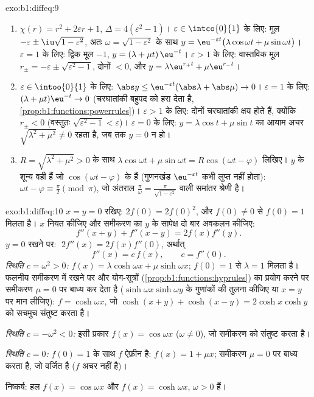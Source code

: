 \begin{solution}{exo:b1:diffeq:9}
\begin{enumerate}
  \item $\chi(r) = r^2 + 2\varepsilon r + 1$, $\Delta = 4(\varepsilon^2 -
  1)$। $\varepsilon \in \intco{0}{1}$ के लिए: मूल $-\varepsilon \pm
  \iu\sqrt{1 - \varepsilon^2}$, अतः $\omega = \sqrt{1 - \varepsilon^2}$ के
  साथ $y = \eu^{-\varepsilon t}\bigl(\lambda\cos\omega t + \mu\sin\omega
  t\bigr)$। $\varepsilon = 1$ के लिए: द्विक मूल $-1$, $y = (\lambda + \mu
  t)\,\eu^{-t}$। $\varepsilon > 1$ के लिए: वास्तविक मूल $r_\pm =
  -\varepsilon \pm \sqrt{\varepsilon^2 - 1}$, दोनों $< 0$, और $y =
  \lambda\eu^{r_+t} + \mu\eu^{r_-t}$।
  \item $\varepsilon \in \intoo{0}{1}$ के लिए: $\abs y \leq
  \eu^{-\varepsilon t}(\abs\lambda + \abs\mu) \to 0$। $\varepsilon = 1$ के
  लिए: $(\lambda + \mu t)\eu^{-t} \to 0$ (चरघातांकी बहुपद को हरा देता है,
  \cref{prop:b1:functions:powerrules})। $\varepsilon > 1$ के लिए: दोनों
  चरघातांकी क्षय होते हैं, क्योंकि $r_\pm < 0$ (वस्तुतः $\sqrt{\varepsilon^2
  - 1} < \varepsilon$)। $\varepsilon = 0$ के लिए: $y = \lambda\cos t +
  \mu\sin t$ का आयाम अचर $\sqrt{\lambda^2 + \mu^2} \neq 0$ रहता है, जब तक $y
  = 0$ न हो।
  \item $R = \sqrt{\lambda^2 + \mu^2} > 0$ के साथ $\lambda\cos\omega t +
  \mu\sin\omega t = R\cos(\omega t - \varphi)$ लिखिए। $y$ के शून्य वही हैं
  जो $\cos(\omega t - \varphi)$ के हैं (गुणनखंड $\eu^{-\varepsilon t}$ कभी
  लुप्त नहीं होता): $\omega t - \varphi \equiv \frac\pi2 \pmod \pi$, जो
  अंतराल $\frac{\pi}{\omega} = \frac{\pi}{\sqrt{1 - \varepsilon^2}}$ वाली
  समांतर श्रेणी है।
\end{enumerate}
\end{solution}

\begin{solution}{exo:b1:diffeq:10}
$x = y = 0$ रखिए: $2f(0) = 2f(0)^2$, और $f(0) \neq 0$ से $f(0) = 1$ मिलता
है। $x$ नियत कीजिए और समीकरण का $y$ के सापेक्ष दो बार अवकलन कीजिए:
\[
f''(x+y) + f''(x-y) = 2 f(x) f''(y) .
\]
$y = 0$ रखने पर: $\;2f''(x) = 2 f(x) f''(0)$, अर्थात्
\[
f''(x) = c\,f(x), \qquad c = f''(0).
\]
\emph{स्थिति $c = \omega^2 > 0$:} $f(x) = \lambda\cosh\omega x +
\mu\sinh\omega x$; $f(0) = 1$ से $\lambda = 1$ मिलता है। फलनीय समीकरण में
रखने पर और योग-सूत्रों (\cref{prop:b1:functions:hyprules}) का प्रयोग करने पर
समीकरण $\mu = 0$ पर बाध्य कर देता है ($\sinh\omega x \sinh\omega y$ के
गुणांकों की तुलना कीजिए या $x = y$ पर मान लीजिए): $f = \cosh\omega x$, जो
$\cosh(x+y) + \cosh(x-y) = 2\cosh x\cosh y$ को सचमुच संतुष्ट करता है।

\emph{स्थिति $c = -\omega^2 < 0$:} इसी प्रकार $f(x) = \cos\omega x$ ($\omega
\neq 0$), जो समीकरण को संतुष्ट करता है।

\emph{स्थिति $c = 0$:} $f(0) = 1$ के साथ $f$ ऐफ़ीन है: $f(x) = 1 + \mu x$;
समीकरण $\mu = 0$ पर बाध्य करता है, जो वर्जित है ($f$ अचर नहीं है)।

निष्कर्ष: हल $f(x) = \cos\omega x$ और $f(x) = \cosh\omega x$, $\omega > 0$
हैं।
\end{solution}

